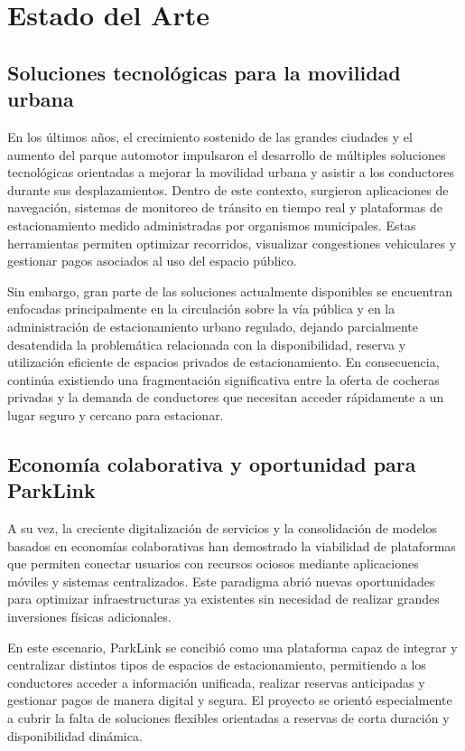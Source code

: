 \section{Estado del Arte}\label{sec:estado_arte}

\subsection{Soluciones tecnológicas para la movilidad urbana}

En los últimos años, el crecimiento sostenido de las grandes ciudades y el aumento del parque automotor impulsaron el desarrollo de múltiples soluciones tecnológicas orientadas a mejorar la movilidad urbana y asistir a los conductores durante sus desplazamientos. Dentro de este contexto, surgieron aplicaciones de navegación, sistemas de monitoreo de tránsito en tiempo real y plataformas de estacionamiento medido administradas por organismos municipales. Estas herramientas permiten optimizar recorridos, visualizar congestiones vehiculares y gestionar pagos asociados al uso del espacio público.

Sin embargo, gran parte de las soluciones actualmente disponibles se encuentran enfocadas principalmente en la circulación sobre la vía pública y en la administración de estacionamiento urbano regulado, dejando parcialmente desatendida la problemática relacionada con la disponibilidad, reserva y utilización eficiente de espacios privados de estacionamiento. En consecuencia, continúa existiendo una fragmentación significativa entre la oferta de cocheras privadas y la demanda de conductores que necesitan acceder rápidamente a un lugar seguro y cercano para estacionar.

\subsection{Economía colaborativa y oportunidad para ParkLink}

A su vez, la creciente digitalización de servicios y la consolidación de modelos basados en economías colaborativas han demostrado la viabilidad de plataformas que permiten conectar usuarios con recursos ociosos mediante aplicaciones móviles y sistemas centralizados. Este paradigma abrió nuevas oportunidades para optimizar infraestructuras ya existentes sin necesidad de realizar grandes inversiones físicas adicionales.

En este escenario, ParkLink se concibió como una plataforma capaz de integrar y centralizar distintos tipos de espacios de estacionamiento, permitiendo a los conductores acceder a información unificada, realizar reservas anticipadas y gestionar pagos de manera digital y segura. El proyecto se orientó especialmente a cubrir la falta de soluciones flexibles orientadas a reservas de corta duración y disponibilidad dinámica.

